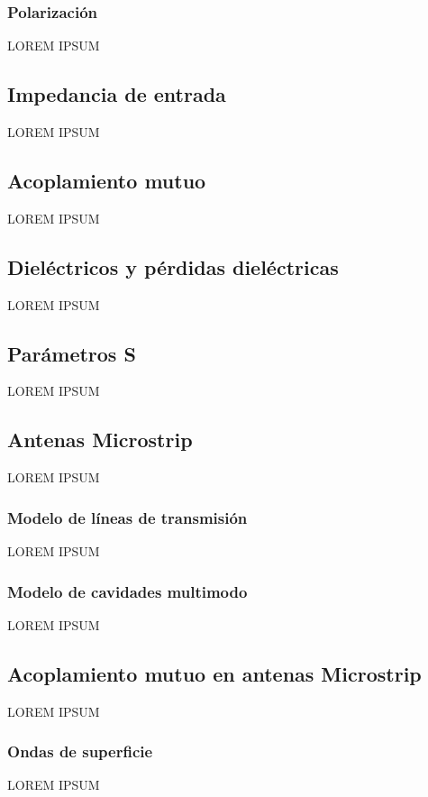 \subsubsection{Polarización}
\label{subsubsec_polarizacion}
LOREM IPSUM

\subsection{Impedancia de entrada}
\label{subsec_imp_entrada}
LOREM IPSUM
\subsection{Acoplamiento mutuo}
\label{subsec_acoplamiento}
LOREM IPSUM
\subsection{Dieléctricos y pérdidas dieléctricas}
\label{subsec_dielectricos}
LOREM IPSUM
\subsection{Parámetros S}
\label{subsec_parametros_s}
LOREM IPSUM

\subsection{Antenas Microstrip}
\label{subsec_antenas_microstrip}
LOREM IPSUM
\subsubsection{Modelo de líneas de transmisión}
\label{subsubsec_microstrip_modeloLineas}
LOREM IPSUM
\subsubsection{Modelo de cavidades multimodo}
\label{subsubsec_microstrip_modeloCavidades}
LOREM IPSUM

\subsection{Acoplamiento mutuo en antenas Microstrip}
\label{subsec_acoplamiento_microstrip}
LOREM IPSUM
\subsubsection{Ondas de superficie}
\label{subsubsec_microstrip_ondas_superficie}
LOREM IPSUM

